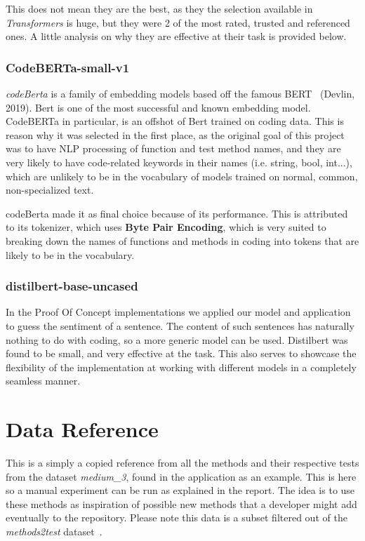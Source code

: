 \documentclass[a4paper, 11pt]{report}
\begin{document}
    This does not mean they are the best, as they the selection available in \textit{Transformers} is huge, but they were 2 of the most rated, trusted and referenced ones. A little analysis on why they are effective at their task is provided below.

    \subsection{CodeBERTa-small-v1}
    \textit{codeBerta} is a family of embedding models based off the famous BERT~\cite{Devlin2019_Bert} (Devlin, 2019). Bert is one of the most successful and known embedding model. CodeBERTa in particular, is an offshot of Bert trained on coding data. This is reason why it was selected in the first place, as the original goal of this project was to have NLP processing of function and test method names, and they are very likely to have code-related keywords in their names (i.e. string, bool, int...), which are unlikely to be in the vocabulary of models trained on normal, common, non-specialized text.

    codeBerta made it as final choice because of its performance. This is attributed to its tokenizer, which uses \textbf{Byte Pair Encoding}, which is very suited to breaking down the names of functions and methods in coding into tokens that are likely to be in the vocabulary.

    \subsection{distilbert-base-uncased}
    In the Proof Of Concept implementations we applied our model and application to guess the sentiment of a sentence. The content of such sentences has naturally nothing to do with coding, so a more generic model can be used. Distilbert was found to be small, and very effective at the task. This also serves to showcase the flexibility of the implementation at working with different models in a completely seamless manner.

\chapter{Data Reference}\label{Apx: Data_reference}
This is a simply a copied reference from all the methods and their respective tests from the dataset \textit{medium\_3}, found in the application as an example. This is here so a manual experiment can be run as explained in the report. The idea is to use these methods as inspiration of possible new methods that a developer might add eventually to the repository. Please note this data is a subset filtered out of the \textit{methods2test} dataset~\cite{tufano2021unit}.
\end{document}
